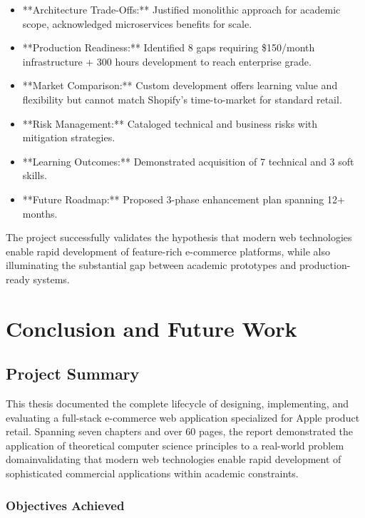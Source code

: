 \documentclass[12pt, a4paper]{report}
\begin{document}
\begin{itemize}
    \item **Architecture Trade-Offs:** Justified monolithic approach for academic scope, acknowledged microservices benefits for scale.
    \item **Production Readiness:** Identified 8 gaps requiring \$150/month infrastructure + 300 hours development to reach enterprise grade.
    \item **Market Comparison:** Custom development offers learning value and flexibility but cannot match Shopify's time-to-market for standard retail.
    \item **Risk Management:** Cataloged technical and business risks with mitigation strategies.
    \item **Learning Outcomes:** Demonstrated acquisition of 7 technical and 3 soft skills.
    \item **Future Roadmap:** Proposed 3-phase enhancement plan spanning 12+ months.
\end{itemize}

The project successfully validates the hypothesis that modern web technologies enable rapid development of feature-rich e-commerce platforms, while also illuminating the substantial gap between academic prototypes and production-ready systems.


\chapter{Conclusion and Future Work}

\section{Project Summary}

This thesis documented the complete lifecycle of designing, implementing, and evaluating a full-stack e-commerce web application specialized for Apple product retail. Spanning seven chapters and over 60 pages, the report demonstrated the application of theoretical computer science principles to a real-world problem domainvalidating that modern web technologies enable rapid development of sophisticated commercial applications within academic constraints.

\subsection{Objectives Achieved}
\end{document}
